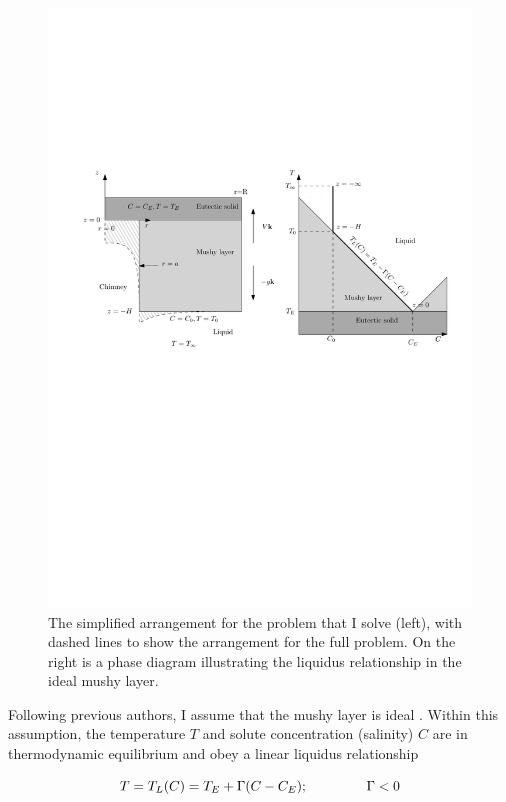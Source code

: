 \documentclass[11pt]{proc}
\begin{document}
\begin{figure}[t]
    \centering
       \includegraphics[width=\textwidth]{simplified-arrangement}
       \caption{The simplified arrangement for the problem that I solve (left), with dashed lines to show the arrangement for the full problem. On the right is a phase diagram illustrating the liquidus relationship in the ideal mushy layer.}
    \label{fig:arrangement}
\end{figure}

Following previous authors, I assume that the mushy layer is ideal \citep*{worster-97}. Within this assumption, the temperature $T$ and solute concentration (salinity) $C$ are in thermodynamic equilibrium and obey a linear liquidus relationship

\begin{equation}
\label{eq:liquidus}
T = T_L(C) = T_E + \Gamma (C-C_E); \hspace{10ex} \Gamma < 0
\end{equation}
\end{document}
